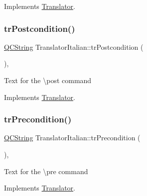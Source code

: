 Implements \mbox{\hyperlink{class_translator}{Translator}}.

\mbox{\label{class_translator_italian_afc5c938520e7d79a1751750bd01683c3}} 
\subsubsection{\texorpdfstring{trPostcondition()}{trPostcondition()}}
{\footnotesize\ttfamily \mbox{\hyperlink{class_q_c_string}{Q\+C\+String}} Translator\+Italian\+::tr\+Postcondition (\begin{DoxyParamCaption}{ }\end{DoxyParamCaption})\hspace{0.3cm}{\ttfamily [inline]}, {\ttfamily [virtual]}}

Text for the \textbackslash{}post command 

Implements \mbox{\hyperlink{class_translator}{Translator}}.

\mbox{\label{class_translator_italian_ab5e955adbe95973acf3cda6d80a8e221}} 
\subsubsection{\texorpdfstring{trPrecondition()}{trPrecondition()}}
{\footnotesize\ttfamily \mbox{\hyperlink{class_q_c_string}{Q\+C\+String}} Translator\+Italian\+::tr\+Precondition (\begin{DoxyParamCaption}{ }\end{DoxyParamCaption})\hspace{0.3cm}{\ttfamily [inline]}, {\ttfamily [virtual]}}

Text for the \textbackslash{}pre command 

Implements \mbox{\hyperlink{class_translator}{Translator}}.

\mbox{\label{class_translator_italian_a06e1f80be0ac99de301d5814e561d0ad}} 

